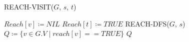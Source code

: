 \begin{algorithm}[H]
    \caption{REACH-VISIT($G$, $s$, $t$)}\label{alg:reach-visit}
    \begin{algorithmic}[1]
            \State $Reach[v] \coloneqq NIL$
        \EndFor
        \State $Reach[t] \coloneqq TRUE$
        \State REACH-DFS($G$, $s$)
        \State $Q \coloneqq \{v \in G.V \mid reach[v] == TRUE\}$
        \State \Return $Q$
    \end{algorithmic}
\end{algorithm}